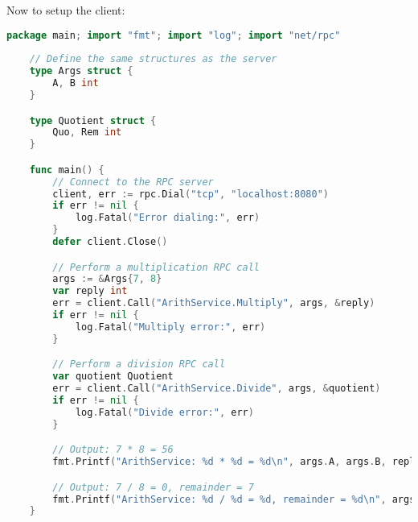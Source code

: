 \newpage 

\begin{Example}

    Now to setup the client:
    \begin{lstlisting}[language=Go, numbers=none]
    package main; import "fmt"; import "log"; import "net/rpc"
    
    // Define the same structures as the server
    type Args struct {
        A, B int
    }

    type Quotient struct {
        Quo, Rem int
    }

    func main() {
        // Connect to the RPC server
        client, err := rpc.Dial("tcp", "localhost:8080")
        if err != nil {
            log.Fatal("Error dialing:", err)
        }
        defer client.Close()

        // Perform a multiplication RPC call
        args := &Args{7, 8}
        var reply int
        err = client.Call("ArithService.Multiply", args, &reply)
        if err != nil {
            log.Fatal("Multiply error:", err)
        }

        // Perform a division RPC call
        var quotient Quotient
        err = client.Call("ArithService.Divide", args, &quotient)
        if err != nil {
            log.Fatal("Divide error:", err)
        }

        // Output: 7 * 8 = 56
        fmt.Printf("ArithService: %d * %d = %d\n", args.A, args.B, reply)

        // Output: 7 / 8 = 0, remainder = 7
        fmt.Printf("ArithService: %d / %d = %d, remainder = %d\n", args.A, args.B, quotient.Quo, quotient.Rem)
    }
    \end{lstlisting}
    \end{Example}
